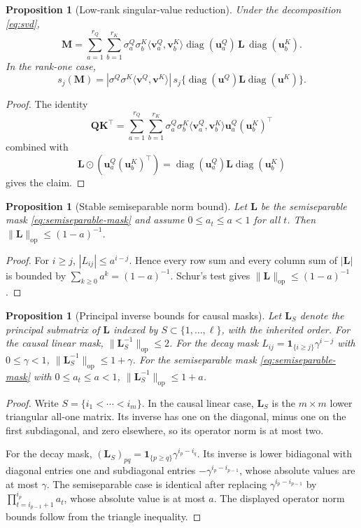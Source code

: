 \documentclass{article}
\newcommand{\diag}{\operatorname{diag}}
\newcommand{\op}{\operatorname{op}}
\newcommand{\one}{\mathbf{1}}
\newcommand{\hadamard}{\mathbin{\odot}}
\newcommand{\bM}{\mathbf{M}}
\newcommand{\bL}{\mathbf{L}}
\newcommand{\bQ}{\mathbf{Q}}
\newcommand{\bK}{\mathbf{K}}
\newcommand{\bu}{\mathbf{u}}
\newcommand{\bv}{\mathbf{v}}
\newtheorem{proposition}[theorem]{Proposition}
\theoremstyle{remark}
\begin{document}
\begin{proposition}[Low-rank singular-value reduction]
Under the decomposition \eqref{eq:svd},
\begin{equation}
    \bM
    =
    \sum_{a=1}^{r_Q}
    \sum_{b=1}^{r_K}
    \sigma^Q_a\sigma^K_b
    \langle \bv^Q_a,\bv^K_b\rangle
    \diag(\bu^Q_a)\,\bL\,\diag(\bu^K_b).
    \label{eq:singular-reduction}
\end{equation}
In the rank-one case,
\[
    s_j(\bM)
    =
    |\sigma^Q\sigma^K\langle \bv^Q,\bv^K\rangle|\,
    s_j\{\diag(\bu^Q)\bL\diag(\bu^K)\}.
\]
\label{prop:singular-reduction}
\end{proposition}

\begin{proof}
The identity
\[
    \bQ\bK^\top
    =
    \sum_{a=1}^{r_Q}
    \sum_{b=1}^{r_K}
    \sigma^Q_a\sigma^K_b
    \langle \bv^Q_a,\bv^K_b\rangle
    \bu^Q_a(\bu^K_b)^\top
\]
combined with
\[
    \bL\hadamard(\bu^Q_a(\bu^K_b)^\top)
    =
    \diag(\bu^Q_a)\bL\diag(\bu^K_b)
\]
gives the claim.
\end{proof}

\begin{proposition}[Stable semiseparable norm bound]
Let $\bL$ be the semiseparable mask \eqref{eq:semiseparable-mask} and assume
$0\leq a_t\leq a<1$ for all $t$.  Then
$\|\bL\|_{\op}\leq(1-a)^{-1}$.
\label{prop:semiseparable-bound}
\end{proposition}

\begin{proof}
For $i\geq j$, $|L_{ij}|\leq a^{i-j}$.  Hence every row sum and every column sum
of $|\bL|$ is bounded by $\sum_{k\geq0}a^k=(1-a)^{-1}$.  Schur's test gives
$\|\bL\|_{\op}\leq(1-a)^{-1}$.
\end{proof}

\begin{proposition}[Principal inverse bounds for causal masks]
Let $\bL_S$ denote the principal submatrix of $\bL$ indexed by
$S\subset\{1,\ldots,\ell\}$, with the inherited order.  For the causal linear
mask, $\|\bL_S^{-1}\|_{\op}\leq2$.  For the decay mask
$L_{ij}=\one_{\{i\geq j\}}\gamma^{i-j}$ with $0\leq\gamma<1$,
$\|\bL_S^{-1}\|_{\op}\leq1+\gamma$.  For the semiseparable mask
\eqref{eq:semiseparable-mask} with $0\leq a_t\leq a<1$,
$\|\bL_S^{-1}\|_{\op}\leq1+a$.
\label{prop:principal-inverse-bound}
\end{proposition}

\begin{proof}
Write $S=\{i_1<\cdots<i_m\}$.  In the causal linear case, $\bL_S$ is the
$m\times m$ lower triangular all-one matrix.  Its inverse has one on the
diagonal, minus one on the first subdiagonal, and zero elsewhere, so its
operator norm is at most two.

For the decay mask, $(\bL_S)_{pq}=\one_{\{p\geq q\}}\gamma^{i_p-i_q}$.  Its
inverse is lower bidiagonal with diagonal entries one and subdiagonal entries
$-\gamma^{i_p-i_{p-1}}$, whose absolute values are at most $\gamma$.  The
semiseparable case is identical after replacing
$\gamma^{i_p-i_{p-1}}$ by $\prod_{t=i_{p-1}+1}^{i_p}a_t$, whose absolute value
is at most $a$.  The displayed operator norm bounds follow from the triangle
inequality.
\end{proof}
\end{document}
